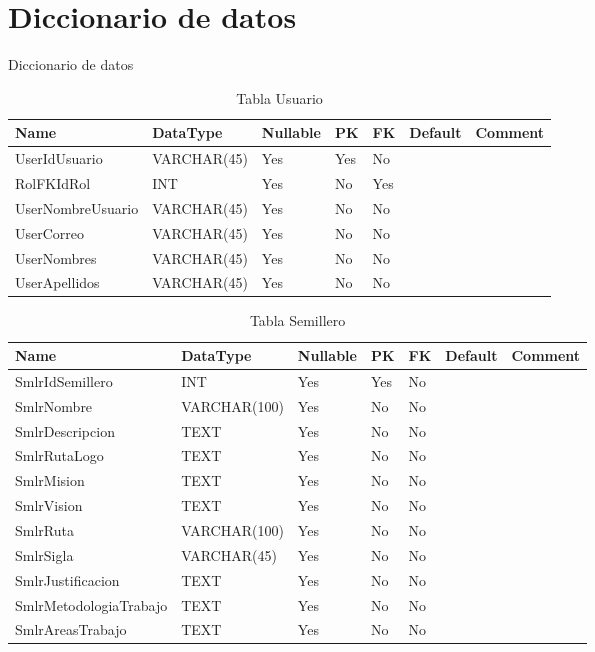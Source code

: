 \chapter{Diccionario de datos}

Diccionario de datos 

\begin{table}
	\caption{Tabla Usuario}
	\label{labelTableUsuario}
	\begin{tabular}{ |l|l|l|l|l|l|l| }
		\hline
		Name & DataType & Nullable & PK & FK & Default & Comment \\ \hline
		UserIdUsuario & VARCHAR(45) & Yes & Yes & No &  & \\ \hline 
		RolFKIdRol & INT & Yes & No & Yes &  & \\ \hline 
		UserNombreUsuario & VARCHAR(45) & Yes & No & No &  & \\ \hline 
		UserCorreo & VARCHAR(45) & Yes & No & No &  & \\ \hline 
		UserNombres & VARCHAR(45) & Yes & No & No &  & \\ \hline 
		UserApellidos & VARCHAR(45) & Yes & No & No &  & \\ \hline 
		
	\end{tabular}
\end{table}


\begin{table}
	\caption{Tabla Semillero}
	\label{labelTableSemillero}
	\begin{tabular}{ |l|l|l|l|l|l|l| }
		\hline
		Name & DataType & Nullable & PK & FK & Default & Comment \\ \hline
		SmlrIdSemillero & INT & Yes & Yes & No &  & \\ \hline 
		SmlrNombre & VARCHAR(100) & Yes & No & No &  & \\ \hline 
		SmlrDescripcion & TEXT & Yes & No & No &  & \\ \hline 
		SmlrRutaLogo & TEXT & Yes & No & No &  & \\ \hline 
		SmlrMision & TEXT & Yes & No & No &  & \\ \hline 
		SmlrVision & TEXT & Yes & No & No &  & \\ \hline 
		SmlrRuta & VARCHAR(100) & Yes & No & No &  & \\ \hline 
		SmlrSigla & VARCHAR(45) & Yes & No & No &  & \\ \hline 
		SmlrJustificacion & TEXT & Yes & No & No &  & \\ \hline 
		SmlrMetodologiaTrabajo & TEXT & Yes & No & No &  & \\ \hline 
		SmlrAreasTrabajo & TEXT & Yes & No & No &  & \\ \hline 
		
	\end{tabular}
\end{table}


